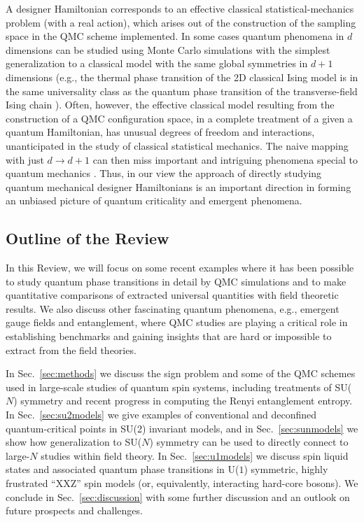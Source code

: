 \documentclass[10pt,pre,aps,twocolumn,showpacs,superscriptaddress,floatfix]{revtex4-1}
\begin{document}
A designer Hamiltonian corresponds to an effective classical statistical-mechanics problem (with a real action), which arises out of the construction 
of the sampling space in the QMC scheme implemented. In some cases quantum phenomena in $d$ dimensions can be studied using Monte Carlo simulations with 
the simplest generalization to a classical model with the same global symmetries in $d+1$ dimensions \cite{Rieger94,Sorensen92,Nahum11} (e.g., the thermal 
phase transition of the 2D classical Ising model is in the same universality class as the quantum phase transition of the transverse-field Ising chain 
\cite{Suzuki76,Sachdev11}). Often, however, the effective classical model resulting from the construction of a QMC configuration space, in a complete treatment
of a given a quantum Hamiltonian, has unusual degrees of freedom and interactions, unanticipated in the study of classical statistical mechanics. The naive 
mapping with just $d \to d+1$ can then miss important and intriguing phenomena special to quantum mechanics \cite{Senthil04a,Fradkin04,Sachdev08}. Thus, in our 
view the approach of directly studying quantum mechanical designer Hamiltonians is an important direction in forming an unbiased picture of quantum 
criticality and emergent phenomena.

\subsection{Outline of the Review}

In this Review, we will focus on some recent examples where it has been possible to study quantum phase transitions in detail 
by QMC simulations and to make quantitative comparisons of extracted universal quantities with field theoretic results. We also discuss other fascinating quantum phenomena, e.g., emergent gauge fields and entanglement, where QMC studies are
playing a critical role in establishing benchmarks and gaining insights that are hard or impossible to extract from the field theories.

In Sec.~\ref{sec:methods} we discuss the sign problem and some of the QMC schemes used in large-scale studies of quantum spin systems, 
including treatments of SU($N$) symmetry and recent progress in computing the Renyi entanglement entropy. In Sec.~\ref{sec:su2models} 
we give examples of conventional and deconfined quantum-critical points in SU(2) invariant models, and in Sec.~\ref{sec:sunmodels} 
we show how generalization to SU($N$) symmetry can be used to directly connect to large-$N$ studies within field theory. In Sec.~\ref{sec:u1models} 
we discuss spin liquid states and associated quantum phase transitions in U($1$) symmetric, highly frustrated ``XXZ'' spin models (or, equivalently, 
interacting hard-core bosons). We conclude in Sec.~\ref{sec:discussion} with some further discussion and an outlook on future prospects and challenges.
\end{document}
